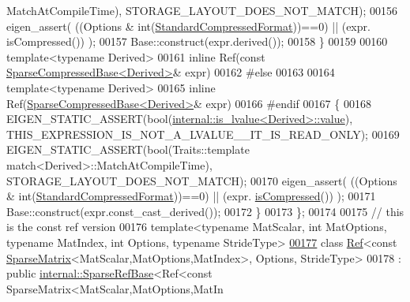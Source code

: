 \begin{DoxyCode}
      MatchAtCompileTime), STORAGE\_LAYOUT\_DOES\_NOT\_MATCH);
00156       eigen\_assert( ((Options & \textcolor{keywordtype}{int}(\hyperlink{namespace_eigen_a668ffb0fb66c55c1c98bd35c52df648eaf81fc519ed9cc0ebc6aac69a366086a5}{StandardCompressedFormat}))==0) || (expr.
      isCompressed()) );
00157       Base::construct(expr.derived());
00158     \}
00159     
00160     \textcolor{keyword}{template}<\textcolor{keyword}{typename} Derived>
00161     \textcolor{keyword}{inline} Ref(\textcolor{keyword}{const} \hyperlink{group___sparse_core___module_class_eigen_1_1_sparse_compressed_base}{SparseCompressedBase<Derived>}& expr)
00162     \textcolor{preprocessor}{#else}
00163 
00164     \textcolor{keyword}{template}<\textcolor{keyword}{typename} Derived>
00165     \textcolor{keyword}{inline} Ref(\hyperlink{group___sparse_core___module_class_eigen_1_1_sparse_compressed_base}{SparseCompressedBase<Derived>}& expr)
00166     \textcolor{preprocessor}{#endif}
00167     \{
00168       EIGEN\_STATIC\_ASSERT(\textcolor{keywordtype}{bool}(\hyperlink{struct_eigen_1_1internal_1_1is__lvalue}{internal::is\_lvalue<Derived>::value}), 
      THIS\_EXPRESSION\_IS\_NOT\_A\_LVALUE\_\_IT\_IS\_READ\_ONLY);
00169       EIGEN\_STATIC\_ASSERT(\textcolor{keywordtype}{bool}(Traits::template match<Derived>::MatchAtCompileTime), 
      STORAGE\_LAYOUT\_DOES\_NOT\_MATCH);
00170       eigen\_assert( ((Options & \textcolor{keywordtype}{int}(\hyperlink{namespace_eigen_a668ffb0fb66c55c1c98bd35c52df648eaf81fc519ed9cc0ebc6aac69a366086a5}{StandardCompressedFormat}))==0) || (expr.
      \hyperlink{group___sparse_core___module_a837934b33a80fe996ff20500373d3a61}{isCompressed}()) );
00171       Base::construct(expr.const\_cast\_derived());
00172     \}
00173 \};
00174 
00175 \textcolor{comment}{// this is the const ref version}
00176 \textcolor{keyword}{template}<\textcolor{keyword}{typename} MatScalar, \textcolor{keywordtype}{int} MatOptions, \textcolor{keyword}{typename} MatIndex, \textcolor{keywordtype}{int} Options, \textcolor{keyword}{typename} Str\textcolor{keywordtype}{id}eType>
\hyperlink{class_eigen_1_1_ref_3_01const_01_sparse_matrix_3_01_mat_scalar_00_01_mat_options_00_01_mat_index1bbfd78857ba9c14d54178cb3009ac38}{00177} \textcolor{keyword}{class }\hyperlink{group___core___module_class_eigen_1_1_ref}{Ref}<const \hyperlink{group___sparse_core___module_class_eigen_1_1_sparse_matrix}{SparseMatrix}<MatScalar,MatOptions,MatIndex>, Options, StrideType>
00178   : \textcolor{keyword}{public} \hyperlink{class_eigen_1_1internal_1_1_sparse_ref_base}{internal::SparseRefBase}<Ref<const SparseMatrix<MatScalar,MatOptions,MatIn

\end{DoxyCode}
